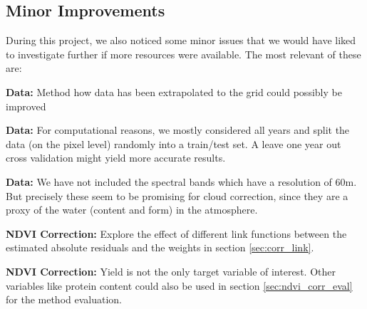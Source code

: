 {    \subsection{Minor Improvements}
        During this project, we also noticed some minor issues that we would have liked to investigate further if more resources were available. The most relevant of these are:
        \begin{Nitemize}
            \item \textbf{Data:}
            Method how data has been extrapolated to the grid could possibly be improved
            \item \textbf{Data:}
            For computational reasons, we mostly considered all years and split the data (on the pixel level) randomly into a train/test set. A leave one year out cross validation might yield more accurate results.
            \item \textbf{Data:}
            We have not included the spectral bands which have a resolution of 60m. But precisely these seem to be promising for cloud correction, since they are a proxy of the water (content and form) in the atmosphere.
            \item \textbf{NDVI Correction:}
            Explore the effect of different link functions between the estimated absolute residuals and the weights in section \ref{sec:corr_link}.
            \item \textbf{NDVI Correction:}
            Yield is not the only target variable of interest. Other variables like protein content could also be used in section \ref{sec:ndvi_corr_eval} for the method evaluation. 
        \end{Nitemize}
}


